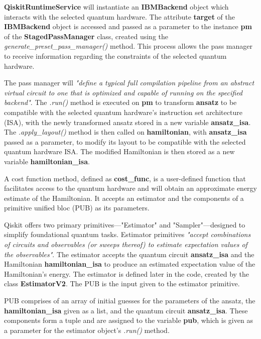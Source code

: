 \documentclass{article}
\begin{document}
{\textbf{QiskitRuntimeService} will instantiate an \textbf{IBMBackend} object which interacts with the selected quantum hardware. The attribute \textbf{target} of the \textbf{IBMBackend} object is accessed and passed as a parameter to the instance \textbf{pm} of the \textbf{StagedPassManager} class, created using the \textit{generate\_preset\_pass\_manager()} method. This process allows the pass manager to receive information regarding the constraints of the selected quantum hardware.

The pass manager will \textit{"define a typical full compilation pipeline from an abstract virtual circuit to one that is optimized and capable of running on the specified backend"}\cite{StagedPassManager}. The \textit{.run()} method is executed on \textbf{pm} to transform \textbf{ansatz} to be compatible with the selected quantum hardware's instruction set architecture (ISA)\cite{ISACirc}, with the newly transformed ansatz stored in a new variable \textbf{ansatz\_isa}. The \textit{.apply\_layout()} method is then called on \textbf{hamiltonian}, with \textbf{ansatz\_isa} passed as a parameter, to modify its layout to be compatible with the selected quantum hardware ISA. The modified Hamiltonian is then stored as a new variable  \textbf{hamiltonian\_isa}.

A cost function method, defined as \textbf{cost\_func}, is a user-defined function that facilitates access to the quantum hardware and will obtain an approximate energy estimate of the Hamiltonian. It accepts an estimator and the components of a primitive unified bloc (PUB) as its parameters. 

 Qiskit offers two primary primitives—"Estimator" and "Sampler"—designed to simplify foundational quantum tasks\cite{QiskitRuntime}. Estimator primitives \textit{"accept combinations of circuits and observables (or sweeps thereof) to estimate expectation values of the observables"}\cite{Primitives}. The estimator accepts the quantum circuit \textbf{ansatz\_isa} and the Hamiltonian \textbf{hamiltonian\_isa} to produce an estimated expectation value of the Hamiltonian's energy. The estimator is defined later in the code, created by the class \textbf{EstimatorV2}. The PUB is the input given to the estimator primitive.

PUB comprises of an array of initial guesses for the parameters of the ansatz, the \textbf{hamiltonian\_isa} given as a list, and the quantum circuit \textbf{ansatz\_isa}. These components form a tuple and are assigned to the variable \textbf{pub}, which is given as a parameter for the estimator object's \textit{.run()} method. 

}
\end{document}
